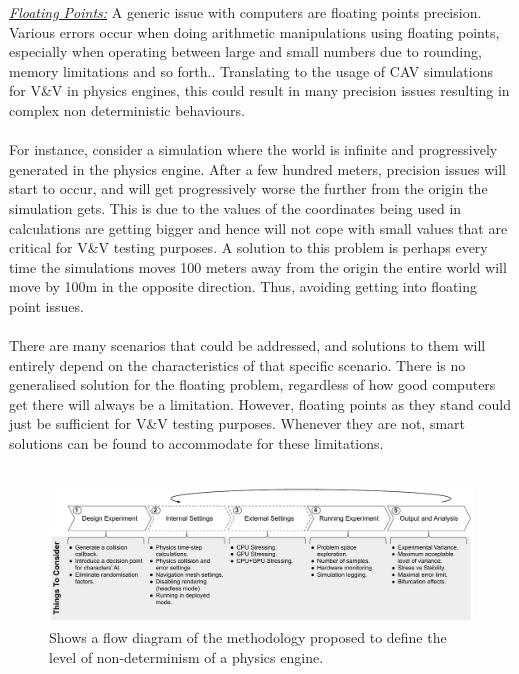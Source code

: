 \noindent\underline{\textit{Floating Points:}}
A generic issue with computers are floating points precision. 
Various errors occur when doing arithmetic manipulations using floating points, especially when operating between large and small numbers due to rounding, memory limitations and so forth.\cite{FloatingPointArithmeticArticle}\cite{FloatingPointsBook}. 
Translating to the usage of CAV simulations for V\&V in physics engines, this could result in many precision issues resulting in complex non deterministic behaviours.\\\\ 
\noindent For instance, consider a simulation where the world is infinite and progressively  generated in the physics engine. 
After a few hundred meters, precision issues will start to occur, and will get progressively worse the further from the origin the simulation gets. 
This is due to the values of the coordinates being used in calculations are getting bigger and hence will not cope with small values that are critical for V\&V testing purposes. 
A solution to this problem is perhaps every time the simulations moves 100 meters away from the origin the entire world will move by 100m in the opposite direction. Thus, avoiding getting into floating point issues.\cite{FloatingPointArithmeticArticle}\\\\
\noindent There are many scenarios that could be addressed, and solutions to them will entirely depend on the characteristics of that specific scenario. There is no generalised solution for the floating problem, regardless of how good computers get there will always be a limitation. However, floating points as they stand could just be sufficient for V\&V testing purposes. Whenever they are not, smart solutions can be found to accommodate for these limitations.\\\\
\begin{figure}[b]
    \centering
    \includegraphics[width=0.99\linewidth]{Other/Figures/MethodologyDiagramCropped.pdf}
    \caption{Shows a flow diagram of the methodology proposed to define the level of non-determinism of a physics engine.}

    \label{method_diagram}
\end{figure}
